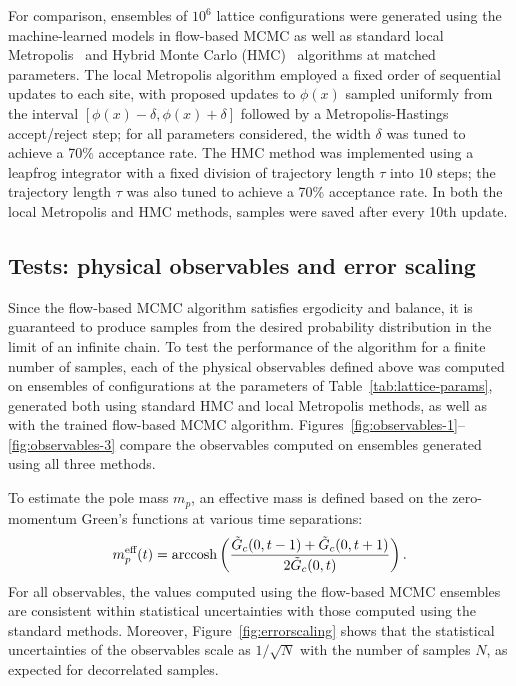 For comparison, ensembles of $10^6$ lattice configurations were generated using the machine-learned models in flow-based MCMC as well as standard local Metropolis~\cite{Wolff1996} and Hybrid Monte Carlo (HMC)~\cite{Duane1987HMC} algorithms at matched parameters. The local Metropolis algorithm employed a fixed order of sequential updates to each site, with proposed updates to $\phi(x)$ sampled uniformly from the interval $[\phi(x)-\delta, \phi(x)+\delta]$ followed by a Metropolis-Hastings accept/reject step; for all parameters considered, the width $\delta$ was tuned to achieve a 70\% acceptance rate. The HMC method was implemented using a leapfrog integrator with a fixed division of trajectory length $\tau$ into $10$ steps; the trajectory length $\tau$ was also tuned to achieve a 70\% acceptance rate. In both the local Metropolis and HMC methods, samples were saved after every 10th update.


\subsection{Tests: physical observables and error scaling}
\label{subsec:tests}

Since the flow-based MCMC algorithm satisfies ergodicity and balance, it is guaranteed to produce samples from the desired probability distribution in the limit of an infinite chain. To test the performance of the algorithm for a finite number of samples, each of the physical observables defined above was computed on ensembles of configurations at the parameters of Table~\ref{tab:lattice-params}, generated both using standard HMC and local Metropolis methods, as well as with the trained flow-based MCMC algorithm. Figures~\ref{fig:observables-1}--\ref{fig:observables-3} compare the observables computed on ensembles generated using all three methods.

To estimate the pole mass $m_p$, an effective mass is defined based on the zero-momentum Green's functions at various time separations:
\begin{equation}
    m^\text{eff}_p(t) = \text{arccosh}\left(\frac{\tilde{G}_c(0,t-1) + \tilde{G}_c(0,t+1)}{2 \tilde{G}_c(0,t)}\right).
\end{equation}
For all observables, the values computed using the flow-based MCMC ensembles are consistent within statistical uncertainties with those computed using the standard methods.
%
Moreover, Figure~\ref{fig:errorscaling} shows that the statistical uncertainties of the observables scale as $1 / \sqrt{N}$ with the number of samples $N$, as expected for decorrelated samples.

